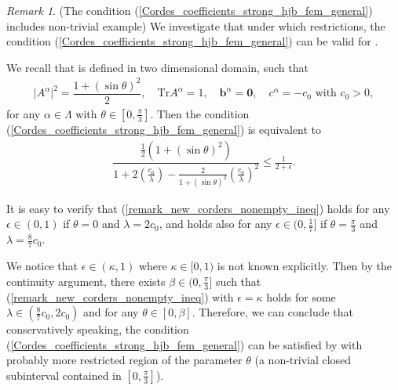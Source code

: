 \documentclass[12pt]{amsart}
\theoremstyle{definition}
\theoremstyle{remark}
\newtheorem{remark}[theorem]{Remark}
\begin{document}
\begin{remark}
\label{remark_new_corders_nonempty}
(The condition (\ref{Cordes_coefficients_strong_hjb_fem_general}) includes non-trivial example) 
We investigate that under which restrictions, the condition (\ref{Cordes_coefficients_strong_hjb_fem_general}) 
can be valid for \cite[Example~$1$]{SmearsSuli2014}.  

We recall that \cite[Example~$1$]{SmearsSuli2014} is defined in two dimensional domain, such that 
\begin{align*}
\vert A^{\alpha}\vert^{2} = \dfrac{1 + (\sin \theta)^{2}}{2}, \quad 
\text{Tr}A^{\alpha} = 1, \quad \boldsymbol{b}^{\alpha} = \boldsymbol{0}, 
\quad c^{\alpha} = -c_{0} \text{ with } c_{0} > 0, 
\end{align*}
for any $\alpha \in \Lambda$ with $\theta \in [0,\frac{\pi}{3}]$.
Then the condition (\ref{Cordes_coefficients_strong_hjb_fem_general}) is equivalent to 
\begin{align}
\label{remark_new_corders_nonempty_ineq}
\dfrac{\frac{1}{2}(1 + (\sin \theta)^{2})}{1 + 2(\frac{c_{0}}{\lambda}) 
- \frac{2}{1+(\sin \theta)^{2}}(\frac{c_{0}}{\lambda})^{2}} \leq \frac{1}{2+\epsilon}.
\end{align}

It is easy to verify that (\ref{remark_new_corders_nonempty_ineq}) holds for any $\epsilon \in (0,1)$ 
if $\theta = 0$ and $\lambda = 2c_{0}$, and holds also for any $\epsilon \in (0, \frac{1}{7}]$ 
if $\theta = \frac{\pi}{3}$ and $\lambda = \frac{8}{7}c_{0}$. 

We notice that $\epsilon \in (\kappa ,1)$ where $\kappa \in [0,1)$ is not known explicitly. 
Then by the continuity argument, there exists $\beta \in (0, \frac{\pi}{3}]$ such that 
(\ref{remark_new_corders_nonempty_ineq}) with $\epsilon = \kappa$ holds for some $\lambda 
\in (\frac{8}{7}c_{0}, 2c_{0})$ and for any $\theta \in [0, \beta]$.
Therefore, we can conclude that conservatively speaking, the condition 
(\ref{Cordes_coefficients_strong_hjb_fem_general}) can be satisfied by \cite[Example~$1$]{SmearsSuli2014} 
with probably more restricted region 
of the parameter $\theta$ (a non-trivial closed subinterval contained in $[0,\frac{\pi}{3}]$). 
\end{remark}
\end{document}
